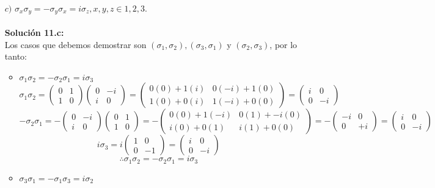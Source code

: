 \begin{itemize}
\item [$c)$] $\sigma_x\sigma_y=-\sigma_y\sigma_x=i\sigma_z, x,y,z \in {1,2,3}.$\\\\
    \textbf{Soluci\'on 11.c:}\\
Los casos que debemos demostrar son $(\sigma_1,\sigma_2), (\sigma_3,\sigma_1)$ y $(\sigma_2,\sigma_3)$, por lo tanto:
\begin{itemize}
    \item $\sigma_1\sigma_2=-\sigma_2\sigma_1=i\sigma_3$
    \[\sigma_1\sigma_2= \begin{pmatrix} 0 & 1\\ 1 & 0
\end{pmatrix} \begin{pmatrix} 0 & -i \\ i & 0\end{pmatrix}= \begin{pmatrix} 0(0)+1(i) & 0(-i)+1(0)\\ 1(0)+0(i) & 1(-i)+0(0)\end{pmatrix}=\begin{pmatrix} i & 0 \\ 0 & -i\end{pmatrix}\]
\[-\sigma_2\sigma_1=-\begin{pmatrix} 0 & -i \\ i & 0 \end{pmatrix} \begin{pmatrix} 0 & 1 \\ 1 & 0 \end{pmatrix}= -\begin{pmatrix} 0(0)+1(-i) & 0(1)+-i(0)\\ i(0)+0(1) & i(1)+0(0)\end{pmatrix}=-\begin{pmatrix} -i & 0\\ 0 & +i\end{pmatrix}=\begin{pmatrix} i & 0 \\ 0 & -i \end{pmatrix}\]
\[i\sigma_3 =i \begin{pmatrix} 1 & 0 \\ 0 & -1 \end{pmatrix}=\begin{pmatrix} i & 0 \\ 0 & -i \end{pmatrix}\]
\[\therefore \sigma_1\sigma_2=-\sigma_2\sigma_1=i\sigma_3\]
    \item $\sigma_3\sigma_1=-\sigma_1\sigma_3=i\sigma_2$

\end{itemize}
\end{itemize}
